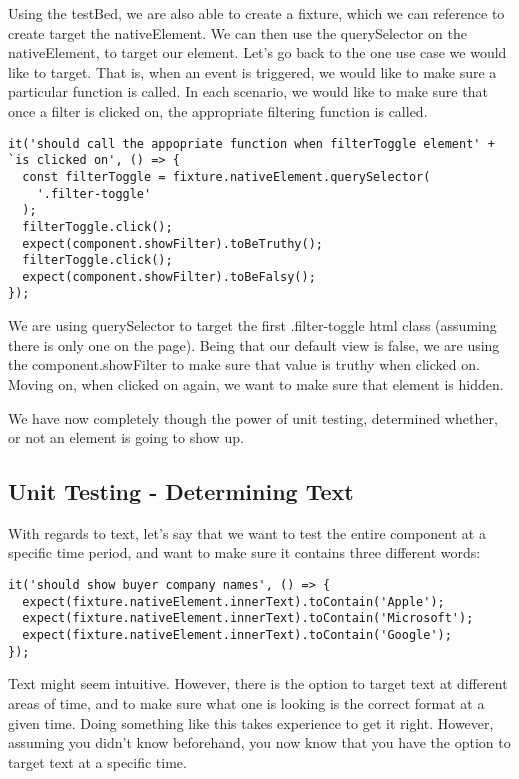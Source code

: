 Using the testBed, we are also able to create a fixture, which we can reference
to create target the nativeElement. We can then use the querySelector on the
nativeElement, to target our element. Let's go back to the one use case we
would like to target. That is, when an event is triggered, we would like to
make sure a particular function is called. In each scenario, we would like to
make sure that once a filter is clicked on, the appropriate filtering function
is called.

\begin{lstlisting}
it('should call the appopriate function when filterToggle element' +
`is clicked on', () => {
  const filterToggle = fixture.nativeElement.querySelector(
    '.filter-toggle'
  );
  filterToggle.click();
  expect(component.showFilter).toBeTruthy();
  filterToggle.click();
  expect(component.showFilter).toBeFalsy();
});
\end{lstlisting}

We are using querySelector to target the first .filter-toggle html class
(assuming there is only one on the page). Being that our default view is false,
we are using the component.showFilter to make sure that value is truthy when
clicked on. Moving on, when clicked on again, we want to make sure that element
is hidden. 

We have now completely though the power of unit testing, determined whether, or
not an element is going to show up.

\subsection{ Unit Testing - Determining Text }
With regards to text, let's say that we want to test the entire component at a
specific time period, and want to make sure it contains three different words:
\begin{lstlisting}
it('should show buyer company names', () => {
  expect(fixture.nativeElement.innerText).toContain('Apple');
  expect(fixture.nativeElement.innerText).toContain('Microsoft');
  expect(fixture.nativeElement.innerText).toContain('Google');
});
\end{lstlisting}

Text might seem intuitive. However, there is the option to target text at
different areas of time, and to make sure what one is looking is the correct
format at a given time. Doing something like this takes experience to get it
right. However, assuming you didn't know beforehand, you now know that you have
the option to target text at a specific time.
